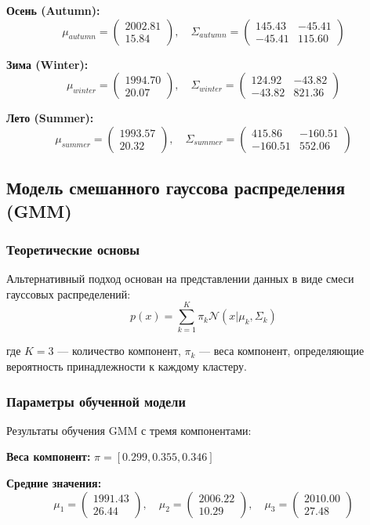 \documentclass[12pt, a4paper]{article}
\begin{document}
\textbf{Осень (Autumn):}
\[ \mu_{autumn} = \begin{pmatrix} 2002.81 \\ 15.84 \end{pmatrix}, \quad \Sigma_{autumn} = \begin{pmatrix} 145.43 & -45.41 \\ -45.41 & 115.60 \end{pmatrix} \]

\textbf{Зима (Winter):}
\[ \mu_{winter} = \begin{pmatrix} 1994.70 \\ 20.07 \end{pmatrix}, \quad \Sigma_{winter} = \begin{pmatrix} 124.92 & -43.82 \\ -43.82 & 821.36 \end{pmatrix} \]

\textbf{Лето (Summer):}
\[ \mu_{summer} = \begin{pmatrix} 1993.57 \\ 20.32 \end{pmatrix}, \quad \Sigma_{summer} = \begin{pmatrix} 415.86 & -160.51 \\ -160.51 & 552.06 \end{pmatrix} \]

\subsection{Модель смешанного гауссова распределения (GMM)}
\subsubsection{Теоретические основы}
Альтернативный подход основан на представлении данных в виде смеси гауссовых распределений:
\[ p(x) = \sum_{k=1}^{K} \pi_k \mathcal{N}(x | \mu_k, \Sigma_k) \]

где $K=3$ --- количество компонент, $\pi_k$ --- веса компонент, определяющие вероятность принадлежности к каждому кластеру.

\subsubsection{Параметры обученной модели}
Результаты обучения GMM с тремя компонентами:

\textbf{Веса компонент:} $\pi = [0.299, 0.355, 0.346]$

\textbf{Средние значения:}
\[ \mu_1 = \begin{pmatrix} 1991.43 \\ 26.44 \end{pmatrix}, \quad \mu_2 = \begin{pmatrix} 2006.22 \\ 10.29 \end{pmatrix}, \quad \mu_3 = \begin{pmatrix} 2010.00 \\ 27.48 \end{pmatrix} \]
\end{document}
